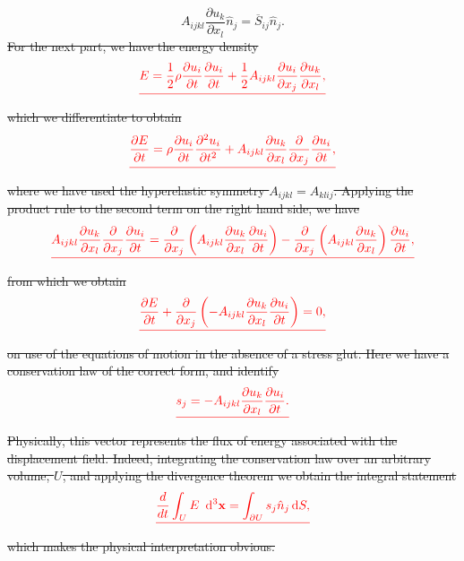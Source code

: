 \documentclass[a4paper,10pt]{paper}
\providecommand{\DIFdel}[1]{{\protect\color{red}\sout{#1}}}                      %
\providecommand{\DIFdelbegin}{} %
\providecommand{\DIFdelend}{} %
\begin{document}
\begin{enumerate}
\begin{equation*}
    A_{ijkl}\frac{\partial u_{k}}{\partial x_{l}}\hat{n}_{j}=\overline{S}_{ij}\hat{n}_{j}.
\end{equation*}
\DIFdelbegin \DIFdel{For the next part, we have the energy density
}\begin{displaymath}
    \DIFdel{E=\frac{1}{2}\rho\frac{\partial u_{i}}{\partial t}\frac{\partial u_{i}}{\partial t}+\frac{1}{2}A_{ijkl}\frac{\partial u_{i}}{\partial x_{j}}\frac{\partial u_{k}}{\partial x_{l}},
}\end{displaymath}%
\DIFdel{which we differentiate to obtain
}\begin{displaymath}
    \DIFdel{\frac{\partial E}{\partial t}=\rho\frac{\partial u_{i}}{\partial t}\frac{\partial^{2}u_{i}}{\partial t^{2}}+A_{ijkl}\frac{\partial u_{k}}{\partial x_{l}}\frac{\partial}{\partial x_{j}}\frac{\partial u_{i}}{\partial t},
}\end{displaymath}%
\DIFdel{where we have used the hyperelastic symmetry $A_{ijkl}=A_{klij}$. Applying the product rule to the second term on the right hand side, we have
}\begin{displaymath}
    \DIFdel{A_{ijkl}\frac{\partial u_{k}}{\partial x_{l}}\frac{\partial}{\partial x_{j}}\frac{\partial u_{i}}{\partial t}=\frac{\partial}{\partial x_{j}}\left(A_{ijkl}\frac{\partial u_{k}}{\partial x_{l}}\frac{\partial u_{i}}{\partial t}\right)-\frac{\partial}{\partial x_{j}}\left(A_{ijkl}\frac{\partial u_{k}}{\partial x_{l}}\right)\frac{\partial u_{i}}{\partial t},
}\end{displaymath}%
\DIFdel{from which we obtain
}\begin{displaymath}
    \DIFdel{\frac{\partial E}{\partial t}+\frac{\partial}{\partial x_{j}}\left(-A_{ijkl}\frac{\partial u_{k}}{\partial x_{l}}\frac{\partial u_{i}}{\partial t}\right)=0,
}\end{displaymath}%
\DIFdel{on use of the equations of motion in the absence of a stress glut. Here we have a conservation law of the correct form, and identify
}\begin{displaymath}
    \DIFdel{s_{j}=-A_{ijkl}\frac{\partial u_{k}}{\partial x_{l}}\frac{\partial u_{i}}{\partial t}.
}\end{displaymath}%
\DIFdel{Physically, this vector represents the flux of energy associated with the displacement field. Indeed, integrating the conservation law over an arbitrary volume, $U$, and applying the divergence theorem we obtain the integral statement
}\begin{displaymath}
    \DIFdel{\frac{d}{dt}\int_{U}E~\dd^{3}\mathbf{x}=\int_{\partial U}s_{j}\hat{n}_{j}\dd S,
}\end{displaymath}%
\DIFdel{which makes the physical interpretation obvious.
}\DIFdelend 


\end{enumerate}
\end{document}
